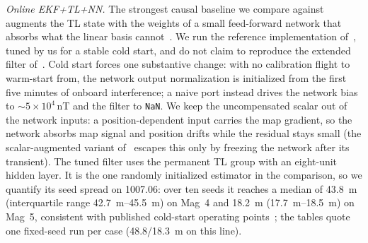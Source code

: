 \documentclass{IEEEtaes}
\begin{document}
\emph{Online EKF+TL+NN.} The strongest causal baseline we compare
against augments the TL state with the weights of a small feed-forward network
that absorbs what the linear basis cannot~\cite{gnadt2022,hager2026}. We run
the reference implementation of~\cite{gnadt2022}, tuned by us for a stable cold
start, and do not claim to reproduce the extended filter of~\cite{hager2026}.
Cold start forces one substantive change: with no calibration flight to
warm-start from, the network output normalization is initialized from the first
five minutes of onboard interference; a naive port instead drives the network
bias to $\sim\!5\times10^{4}$\,\si{\nano\tesla} and the filter to \texttt{NaN}.
We keep the uncompensated scalar out of the network inputs: a
position-dependent input carries the map gradient, so the network absorbs map
signal and position drifts while the residual stays small (the scalar-augmented
variant of~\cite{hager2026} escapes this only by freezing the network after its
transient). The tuned filter uses the permanent TL group with an eight-unit hidden
layer. It is the one randomly initialized estimator in the comparison, so we
quantify its seed spread on 1007.06: over ten seeds it reaches a median of
\SI{43.8}{\meter} (interquartile range \SIrange{42.7}{45.5}{\meter}) on
Mag~4 and \SI{18.2}{\meter} (\SIrange{17.7}{18.5}{\meter}) on Mag~5,
consistent with published cold-start operating
points~\cite{gnadt2022,hager2026}; the tables quote one fixed-seed run per
case (\num{48.8}/\SI{18.3}{\meter} on this line).
\end{document}
